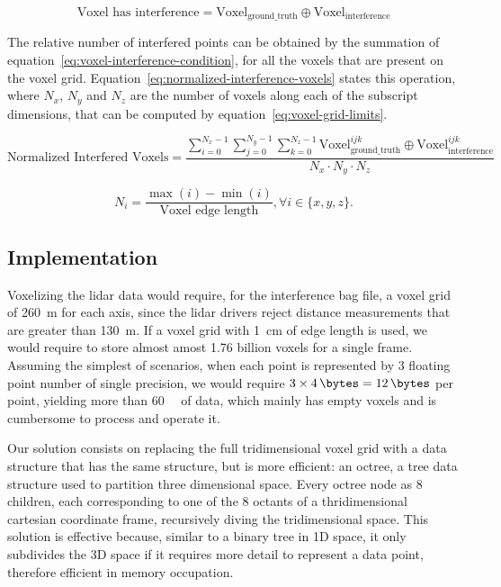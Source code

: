 \begin{equation}
		\label{eq:voxel-interference-condition}
		\text{Voxel has interference} = \text{Voxel}_\text{ground\_truth} \oplus  \text{Voxel}_\text{interference} 
\end{equation}

The relative number of interfered points can be obtained by the summation of equation~\ref{eq:voxel-interference-condition}, for all the voxels that are present on the voxel grid. Equation~\ref{eq:normalized-interference-voxels} states this operation, where $N_x$, $N_y$ and $N_z$ are the number of voxels along each of the subscript dimensions, that can be computed by equation~\ref{eq:voxel-grid-limits}.

\begin{equation}
	\label{eq:normalized-interference-voxels}
	\text{Normalized Interfered Voxels} =\displaystyle \frac{\sum\limits^{N_x - 1}_{i = 0} \sum\limits^{N_y - 1}_{j = 0} \sum\limits^{N_z - 1}_{k = 0} \text{Voxel}_\text{ground\_truth}^{ijk} \oplus  \text{Voxel}_\text{interference}^{ijk}}{N_x\cdot N_y\cdot N_z}
\end{equation}

\begin{equation}
	\label{eq:voxel-grid-limits}
	N_i = \frac{\max(i) - \min(i)}{\text{Voxel edge length}}, \forall i \in \{x, y, z\}.
\end{equation}

\subsection{Implementation}
Voxelizing the \ac{lidar} data would require, for the interference bag file, a voxel grid of \SI{260}{\meter} for each axis, since the \ac{lidar} drivers reject distance measurements that are greater than \SI{130}{\meter}. If a voxel grid with \SI{1}{\centi\meter} of edge length is used, we would require to store almost amost 1.76 billion voxels for a single frame. Assuming the simplest of scenarios, when each point is represented by 3 floating point number of single precision, we would require $3\times \SI{4}{\bytes} = \SI{12}{\bytes}$ per point, yielding more than \SI{60}{\giga\byte} of data, which mainly has empty voxels and is cumbersome to process and operate it.

Our solution consists on replacing the full tridimensional voxel grid with a data structure that has the same structure, but is more efficient: an octree, a tree data structure used to partition three dimensional space. Every octree node as 8 children, each corresponding to one of the 8 octants of a thridimensional cartesian coordinate frame, recursively diving the tridimensional space. This solution is effective because, similar to a binary tree in 1D space, it only subdivides the 3D space if it requires more detail to represent a data point, therefore efficient in memory occupation.

